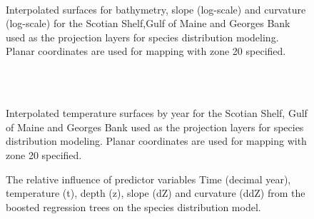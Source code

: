 \documentclass[11pt]{article}
\newcommand{\e}{/backup/bio_data/bio.lobster/figures/} %
\begin{document}
\begin{landscape}
\begin{figure}
\centering

   \\
    \caption{Interpolated surfaces for bathymetry, slope (log-scale) and curvature (log-scale) for the Scotian Shelf,Gulf of Maine and Georges Bank used as the projection layers for species distribution modeling. Planar coordinates are used for mapping with zone 20 specified.}
\end{figure}


\begin{figure}
\centering
   \\
    \\

\caption{Interpolated temperature surfaces by year for the Scotian Shelf, Gulf of Maine and Georges Bank used as the projection layers for species distribution modeling. Planar coordinates are used for mapping with zone 20 specified.}
\end{figure}
\end{landscape}

\begin{figure}

    \caption{The relative influence of predictor variables Time (decimal year), temperature (t), depth (z), slope (dZ) and curvature (ddZ) from the boosted regression trees on the species distribution model.}

\end{figure}
\end{document}
